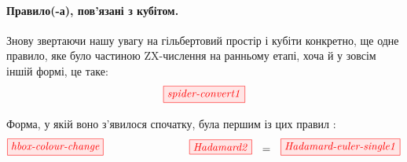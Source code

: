 \documentclass[11pt]{article}
\theoremstyle{definition}
\newcommand{\beq}{\begin{equation}}
\newcommand{\eeq}{\end{equation}\par\noindent}
\begin{document}

\paragraph{Правило(-а), пов’язані з кубітом.}  Знову звертаючи нашу увагу на гільбертовий простір і кубіти конкретно, ще одне правило, яке було частиною ZX-числення на ранньому етапі, хоча й у зовсім іншій формі, це таке:
\beq\label{spider-convert1}
\tikzfig{spider-convert1}   
\eeq
Форма, у якій воно з’явилося спочатку, була першим із цих правил \cite{CD1}:
\beq\label{hbox-colour-change}
\tikzfig{hbox-colour-change}   
\qquad\qquad\qquad\qquad
\tikzfig{Hadamard2}\ \ =\ \ \tikzfig{Hadamard-euler-single1}  
\eeq
\end{document}
